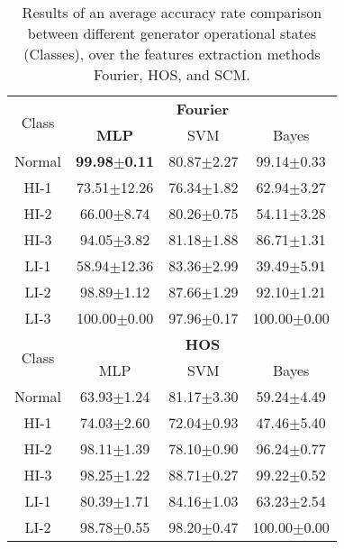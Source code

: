 \documentclass[review]{elsarticle}
\begin{document}
\begin{table}[!htb]
\caption{Results of an average accuracy rate comparison between different generator operational states (Classes), over the features extraction methods Fourier, HOS, and SCM.}
\centering

\begin{tabular}{c|ccc}

\toprule
%         
\hline
\multirow{2}{*}{Class} & \multicolumn{3}{c}{\textbf{Fourier}} \\ 
\cline{2-4}
                       & \textbf{MLP} & SVM & Bayes 
                            \\ \hline           
Normal     & \textbf{99.98$\pm$0.11}   & 80.87$\pm$2.27    & 99.14$\pm$0.33 \\  
HI-1       & 73.51$\pm$12.26  & 76.34$\pm$1.82    & 62.94$\pm$3.27 \\
HI-2       & 66.00$\pm$8.74   & 80.26$\pm$0.75    & 54.11$\pm$3.28 \\
HI-3       & 94.05$\pm$3.82   & 81.18$\pm$1.88    & 86.71$\pm$1.31 \\ 
LI-1       & 58.94$\pm$12.36  & 83.36$\pm$2.99    & 39.49$\pm$5.91 \\ 
LI-2       & 98.89$\pm$1.12   & 87.66$\pm$1.29    & 92.10$\pm$1.21 \\ 
LI-3       & 100.00$\pm$0.00  & 97.96$\pm$0.17    & 100.00$\pm$0.00 \\
\hline
\hline
%
\multirow{2}{*}{Class} & \multicolumn{3}{c}{\textbf{HOS}} \\ 
\cline{2-4}
                       & MLP & SVM & Bayes 
                            \\ \hline           
Normal     & 63.93$\pm$1.24   & 81.17$\pm$3.30    & 59.24$\pm$4.49  \\  
HI-1       & 74.03$\pm$2.60   & 72.04$\pm$0.93    & 47.46$\pm$5.40  \\
HI-2       & 98.11$\pm$1.39   & 78.10$\pm$0.90    & 96.24$\pm$0.77  \\
HI-3       & 98.25$\pm$1.22   & 88.71$\pm$0.27    & 99.22$\pm$0.52  \\ 
LI-1       & 80.39$\pm$1.71   & 84.16$\pm$1.03    & 63.23$\pm$2.54  \\ 
LI-2       & 98.78$\pm$0.55   & 98.20$\pm$0.47    & 100.00$\pm$0.00  \\ 

\end{tabular}
\end{table}
\end{document}
